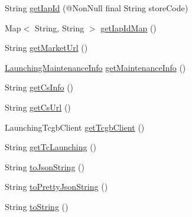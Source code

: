 \begin{DoxyCompactItemize}
\item 
String \hyperlink{classcom_1_1toast_1_1android_1_1gamebase_1_1launching_1_1data_1_1_launching_info_a92287e4e65b01d9f2e38e19fd1861f4f}{get\+Iap\+Id} (@Non\+Null final String store\+Code)
\item 
Map$<$ String, String $>$ \hyperlink{classcom_1_1toast_1_1android_1_1gamebase_1_1launching_1_1data_1_1_launching_info_a2b3622e88b2b8b199f69526ca3ad2177}{get\+Iap\+Id\+Map} ()
\item 
String \hyperlink{classcom_1_1toast_1_1android_1_1gamebase_1_1launching_1_1data_1_1_launching_info_a07ddced6fd80f99c6a8024b6d2da04f7}{get\+Market\+Url} ()
\item 
\hyperlink{classcom_1_1toast_1_1android_1_1gamebase_1_1launching_1_1data_1_1_launching_maintenance_info}{Launching\+Maintenance\+Info} \hyperlink{classcom_1_1toast_1_1android_1_1gamebase_1_1launching_1_1data_1_1_launching_info_a7544771471aa23597d26ae5253cbaf6c}{get\+Maintenance\+Info} ()
\item 
String \hyperlink{classcom_1_1toast_1_1android_1_1gamebase_1_1launching_1_1data_1_1_launching_info_a1786ce2957f82653e6c77e6d6156f8f8}{get\+Cs\+Info} ()
\item 
String \hyperlink{classcom_1_1toast_1_1android_1_1gamebase_1_1launching_1_1data_1_1_launching_info_ab55e2b5ac6e5f8b56cd164b27be6eaac}{get\+Cs\+Url} ()
\item 
Launching\+Tcgb\+Client \hyperlink{classcom_1_1toast_1_1android_1_1gamebase_1_1launching_1_1data_1_1_launching_info_a6f4b28b71933e1de8ca7dcd20eb34d0e}{get\+Tcgb\+Client} ()
\item 
String \hyperlink{classcom_1_1toast_1_1android_1_1gamebase_1_1launching_1_1data_1_1_launching_info_a6cc50f98093215cfa309ac9f68e78f73}{get\+Tc\+Launching} ()
\item 
String \hyperlink{classcom_1_1toast_1_1android_1_1gamebase_1_1base_1_1_value_object_a58acf6402880e9769d79d8667581fa6a}{to\+Json\+String} ()
\item 
String \hyperlink{classcom_1_1toast_1_1android_1_1gamebase_1_1base_1_1_value_object_a054431f3d988a22295cfc8b784ff2637}{to\+Pretty\+Json\+String} ()
\item 
String \hyperlink{classcom_1_1toast_1_1android_1_1gamebase_1_1base_1_1_value_object_ad146fa8579a5f8a876c4688cc5a68520}{to\+String} ()
\end{DoxyCompactItemize}
